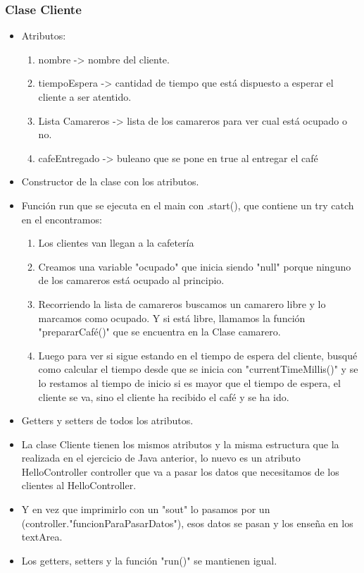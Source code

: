 \documentclass[a4paper,12pt]{article}
\begin{document}
\subsubsection{Clase Cliente}
\begin{itemize}
\item Atributos:
    \begin{enumerate}
        \item nombre -> nombre del cliente.
        \item tiempoEspera -> cantidad de tiempo que está dispuesto a esperar el cliente a ser atentido.
        \item Lista Camareros -> lista de los camareros para ver cual está ocupado o no.
        \item cafeEntregado -> buleano que se pone en true al entregar el café
    \end{enumerate}
\item Constructor de la clase con los atributos.
\item Función run que se ejecuta en el main con .start(), que contiene un try catch en el encontramos:
    \begin{enumerate}
        \item Los clientes van llegan a la cafetería
        \item Creamos una variable "ocupado" que inicia siendo "null" porque ninguno de los camareros está ocupado al principio.
        \item Recorriendo la lista de camareros buscamos un camarero libre y lo marcamos como ocupado. Y si está libre, llamamos la función "prepararCafé()" que se encuentra en la Clase camarero.
        \item Luego para ver si sigue estando en el tiempo de espera del cliente, busqué como calcular el tiempo desde que se inicia con "currentTimeMillis()" y se lo restamos al tiempo de inicio si es mayor que el tiempo de espera, el cliente se va, sino el cliente ha recibido el café y se ha ido.
    \end{enumerate}
\item Getters y setters de todos los atributos. 
\item La clase Cliente tienen los mismos atributos y la misma estructura que la realizada en el ejercicio de Java anterior, lo nuevo es un atributo HelloController controller que va a pasar los datos que necesitamos de los clientes al HelloController.
\item Y en vez que imprimirlo con un "sout" lo pasamos por un (controller."funcionParaPasarDatos"), esos datos se pasan y los enseña en los textArea.
\item Los getters, setters y la función "run()" se mantienen igual.
\end{itemize}
\end{document}
